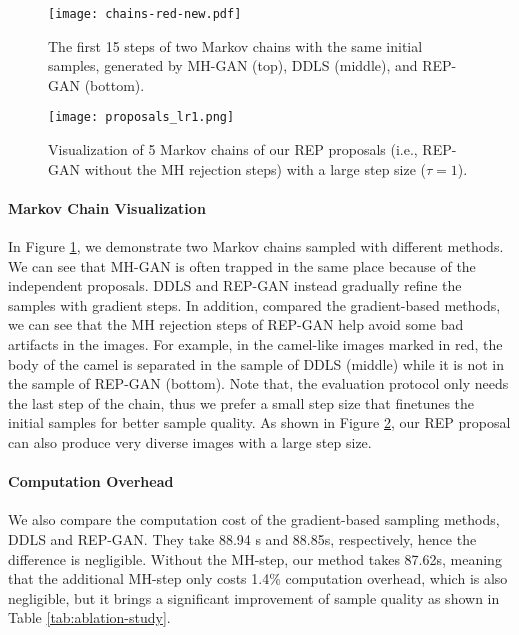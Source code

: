 \documentclass[runningheads]{llncs}
\newcommand{\<}{\left\langle}
\renewcommand{\>}{\right\rangle}
\begin{document}
\begin{figure}[t]\centering
\texttt{[image: chains-red-new.pdf]}
\caption{The first 15 steps of two Markov chains with the same initial samples, generated by 
MH-GAN (top), DDLS (middle), and REP-GAN (bottom).}
\label{fig:sampled-chain}
\end{figure}


\begin{figure}[h]
    \centering
    \texttt{[image: proposals\_lr1.png]}
    \caption{Visualization of 5 Markov chains of our REP proposals (i.e., REP-GAN without the MH rejection steps) with a large step size ($\tau=1$).}
    \label{fig:proposals}
\end{figure}

\paragraph{\textbf{Markov Chain Visualization}} In Figure \ref{fig:sampled-chain}, we demonstrate two Markov chains sampled with different methods.  We can see that 
MH-GAN is often trapped in the same place because of the independent proposals. DDLS and REP-GAN instead gradually refine the samples with gradient steps. In addition, compared the gradient-based methods, we can see that the MH rejection steps of REP-GAN help avoid some bad artifacts in the images. For example, in the camel-like images marked in red, the body of the camel is separated in the sample of DDLS (middle) while it is not in the sample of REP-GAN (bottom). 
Note that, the evaluation protocol only needs the last step of the chain, thus we prefer a small step size that finetunes the initial samples for better sample quality. As shown in Figure \ref{fig:proposals}, our REP proposal can also produce very diverse images with a large step size. 



\paragraph{\textbf{Computation Overhead}} We also compare the computation cost of the gradient-based sampling methods, DDLS and REP-GAN. They take 88.94 s and 88.85s, respectively, hence the difference is negligible. Without the MH-step, our method takes 87.62s, meaning that the additional MH-step only costs 1.4\% computation overhead, which is also negligible, but it brings a significant improvement of sample quality as shown in Table \ref{tab:ablation-study}. 
\end{document}
